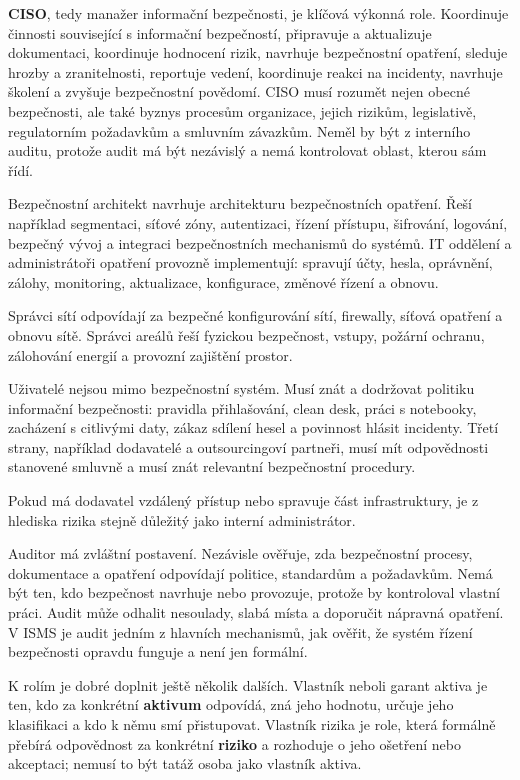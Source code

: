 \textbf{CISO}, tedy manažer informační bezpečnosti, je klíčová výkonná role. Koordinuje činnosti související s informační bezpečností, připravuje a aktualizuje dokumentaci, koordinuje hodnocení rizik, navrhuje bezpečnostní opatření, sleduje hrozby a zranitelnosti, reportuje vedení, koordinuje reakci na incidenty, navrhuje školení a zvyšuje bezpečnostní povědomí. CISO musí rozumět nejen obecné bezpečnosti, ale také byznys procesům organizace, jejich rizikům, legislativě, regulatorním požadavkům a smluvním závazkům. Neměl by být z interního auditu, protože audit má být nezávislý a nemá kontrolovat oblast, kterou sám řídí.

Bezpečnostní architekt navrhuje architekturu bezpečnostních opatření. Řeší například segmentaci, síťové zóny, autentizaci, řízení přístupu, šifrování, logování, bezpečný vývoj a integraci bezpečnostních mechanismů do systémů. IT oddělení a administrátoři opatření provozně implementují: spravují účty, hesla, oprávnění, zálohy, monitoring, aktualizace, konfigurace, změnové řízení a obnovu.

Správci sítí odpovídají za bezpečné konfigurování sítí, firewally, síťová opatření a obnovu sítě. Správci areálů řeší fyzickou bezpečnost, vstupy, požární ochranu, zálohování energií a provozní zajištění prostor.

Uživatelé nejsou mimo bezpečnostní systém. Musí znát a dodržovat politiku informační bezpečnosti: pravidla přihlašování, clean desk, práci s notebooky, zacházení s citlivými daty, zákaz sdílení hesel a povinnost hlásit incidenty. Třetí strany, například dodavatelé a outsourcingoví partneři, musí mít odpovědnosti stanovené smluvně a musí znát relevantní bezpečnostní procedury.

Pokud má dodavatel vzdálený přístup nebo spravuje část infrastruktury, je z hlediska rizika stejně důležitý jako interní administrátor.

Auditor má zvláštní postavení. Nezávisle ověřuje, zda bezpečnostní procesy, dokumentace a opatření odpovídají politice, standardům a požadavkům. Nemá být ten, kdo bezpečnost navrhuje nebo provozuje, protože by kontroloval vlastní práci. Audit může odhalit nesoulady, slabá místa a doporučit nápravná opatření. V ISMS je audit jedním z hlavních mechanismů, jak ověřit, že systém řízení bezpečnosti opravdu funguje a není jen formální.

K rolím je dobré doplnit ještě několik dalších. Vlastník neboli garant aktiva je ten, kdo za konkrétní \textbf{aktivum} odpovídá, zná jeho hodnotu, určuje jeho klasifikaci a kdo k němu smí přistupovat. Vlastník rizika je role, která formálně přebírá odpovědnost za konkrétní \textbf{riziko} a rozhoduje o jeho ošetření nebo akceptaci; nemusí to být tatáž osoba jako vlastník aktiva.

